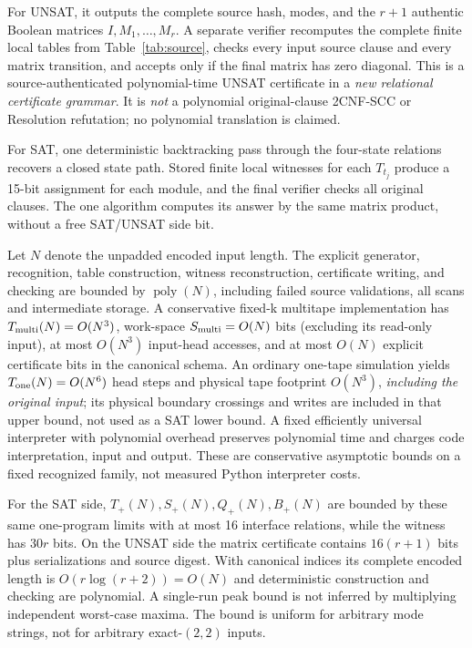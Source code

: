 \documentclass[11pt]{article}
\begin{document}
For UNSAT, it outputs the complete source hash, modes, and the $r+1$ authentic Boolean matrices $I,M_1,\ldots,M_r$. A separate verifier recomputes the complete finite local tables from Table~\ref{tab:source}, checks every input source clause and every matrix transition, and accepts only if the final matrix has zero diagonal. This is a source-authenticated polynomial-time UNSAT certificate in a \emph{new relational certificate grammar}. It is \emph{not} a polynomial original-clause 2CNF-SCC or Resolution refutation; no polynomial translation is claimed.

For SAT, one deterministic backtracking pass through the four-state relations recovers a closed state path. Stored finite local witnesses for each $T_{t_j}$ produce a 15-bit assignment for each module, and the final verifier checks all original clauses. The one algorithm computes its answer by the same matrix product, without a free SAT/UNSAT side bit.

Let $N$ denote the unpadded encoded input length. The explicit generator, recognition, table construction, witness reconstruction, certificate writing, and checking are bounded by $\operatorname{poly}(N)$, including failed source validations, all scans and intermediate storage. A conservative fixed-k multitape implementation has $T_{\rm multi}(N)=O(N^3)$, work-space $S_{\rm multi}=O(N)$ bits (excluding its read-only input), at most $O(N^3)$ input-head accesses, and at most $O(N)$ explicit certificate bits in the canonical schema. An ordinary one-tape simulation yields $T_{\rm one}(N)=O(N^6)$ head steps and physical tape footprint $O(N^3)$, \emph{including the original input}; its physical boundary crossings and writes are included in that upper bound, not used as a SAT lower bound. A fixed efficiently universal interpreter with polynomial overhead preserves polynomial time and charges code interpretation, input and output. These are conservative asymptotic bounds on a fixed recognized family, not measured Python interpreter costs.

For the SAT side, $T_+(N),S_+(N),Q_+(N),B_+(N)$ are bounded by these same one-program limits with at most 16 interface relations, while the witness has $30r$ bits. On the UNSAT side the matrix certificate contains $16(r+1)$ bits plus serializations and source digest. With canonical indices its complete encoded length is $O(r\log(r+2))=O(N)$ and deterministic construction and checking are polynomial. A single-run peak bound is not inferred by multiplying independent worst-case maxima. The bound is uniform for arbitrary mode strings, not for arbitrary exact-$(2,2)$ inputs.
\end{document}
